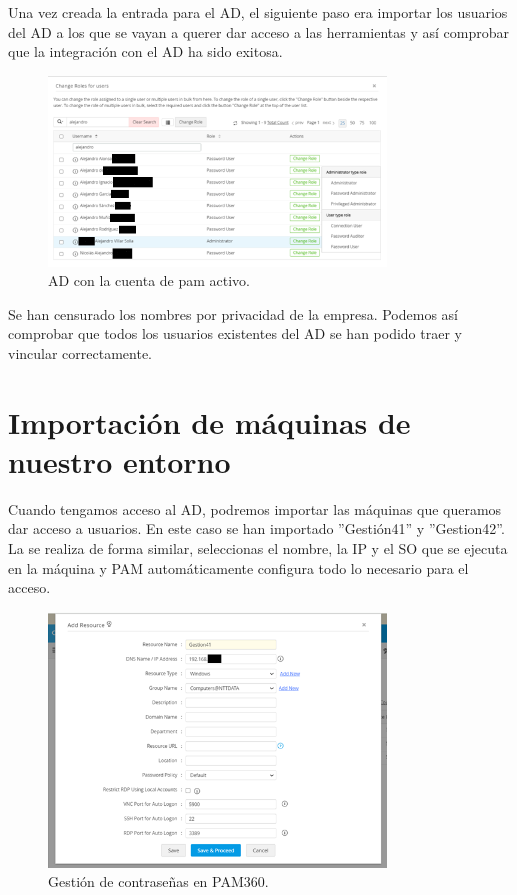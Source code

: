 Una vez creada la entrada para el AD, el siguiente paso era importar los usuarios del AD a los que se vayan a querer dar acceso a las herramientas y así comprobar que la integración con el AD ha sido exitosa.

\begin{figure}[H]
	\centering
	\includegraphics[width=0.8\textwidth]{./img/importacion_usuarios_ad.png}
	\caption{AD con la cuenta de pam activo.}
	\label{fig:pam_ad5}
\end{figure}

Se han censurado los nombres por privacidad de la empresa. Podemos así comprobar que todos los usuarios existentes del AD se han podido traer y vincular correctamente.

\section{Importación de máquinas de nuestro entorno}
Cuando tengamos acceso al AD, podremos importar las máquinas que queramos dar acceso a usuarios. En este caso se han importado ''Gestión41'' y ''Gestion42''. La se realiza de forma similar, seleccionas el nombre, la IP y el SO que se ejecuta en la máquina y PAM automáticamente configura todo lo necesario para el acceso.

\begin{figure}[H]
	\centering
	\includegraphics[width=0.8\textwidth]{./img/gestion41_importar.png}
	\caption{Gestión de contraseñas en PAM360.}
	\label{fig:gestion41_importar}
\end{figure}

